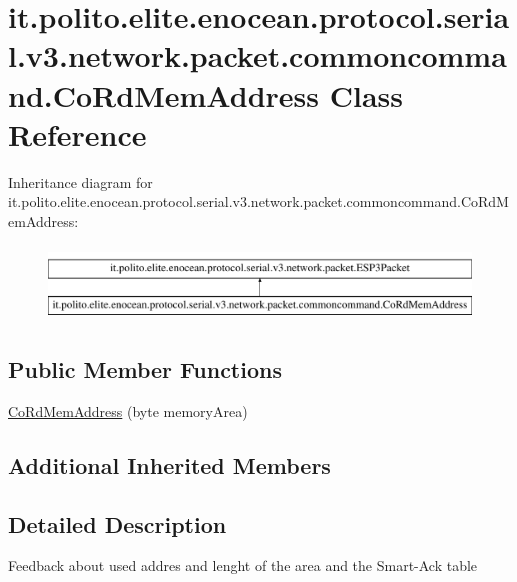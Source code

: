 \hypertarget{classit_1_1polito_1_1elite_1_1enocean_1_1protocol_1_1serial_1_1v3_1_1network_1_1packet_1_1commoncommand_1_1_co_rd_mem_address}{}\section{it.\+polito.\+elite.\+enocean.\+protocol.\+serial.\+v3.\+network.\+packet.\+commoncommand.\+Co\+Rd\+Mem\+Address Class Reference}
\label{classit_1_1polito_1_1elite_1_1enocean_1_1protocol_1_1serial_1_1v3_1_1network_1_1packet_1_1commoncommand_1_1_co_rd_mem_address}
Inheritance diagram for it.\+polito.\+elite.\+enocean.\+protocol.\+serial.\+v3.\+network.\+packet.\+commoncommand.\+Co\+Rd\+Mem\+Address\+:\begin{figure}[H]
\begin{center}
\leavevmode
\includegraphics[height=2.000000cm]{classit_1_1polito_1_1elite_1_1enocean_1_1protocol_1_1serial_1_1v3_1_1network_1_1packet_1_1commoncommand_1_1_co_rd_mem_address}
\end{center}
\end{figure}
\subsection*{Public Member Functions}
\begin{DoxyCompactItemize}
\item 
\hyperlink{classit_1_1polito_1_1elite_1_1enocean_1_1protocol_1_1serial_1_1v3_1_1network_1_1packet_1_1commoncommand_1_1_co_rd_mem_address_a8645b9ea904c6bd82eb7fd283157d0b8}{Co\+Rd\+Mem\+Address} (byte memory\+Area)
\end{DoxyCompactItemize}
\subsection*{Additional Inherited Members}


\subsection{Detailed Description}
Feedback about used addres and lenght of the area and the Smart-\/\+Ack table

